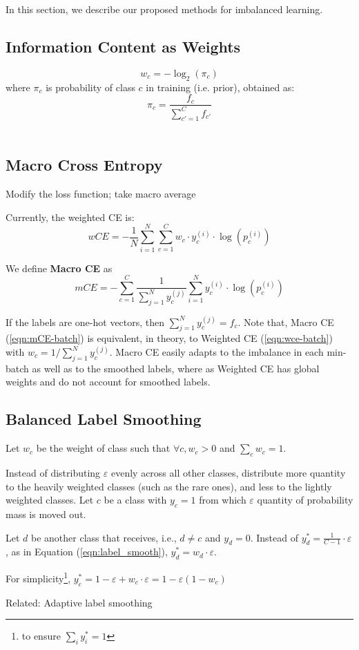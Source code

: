 In this section, we describe our proposed methods for imbalanced learning.
\subsection{Information Content as Weights}

\cite{shannon1948mathematical}
\begin{equation}
   w_c = -\log_2(\pi_c)
\end{equation}
where $\pi_c$ is probability of class $c$ in training (i.e. prior), obtained as: $$\pi_c = \frac{f_c}{\sum^C_{c'=1}f_{c'}}$$\\


\subsection{Macro Cross Entropy}
Modify the loss function; take macro average

Currently, the weighted CE is:
\begin{equation*}
 wCE = -\frac{1}{N} \sum^N_{i=1} \sum^C_{c=1} w_c \cdot y^{(i)}_c \cdot \log(p^{(i)}_c)
\end{equation*}


We define \textbf{Macro CE} as
\begin{equation} \label{eqn:mCE-batch}
  mCE = -\sum^C_{c=1} \frac{1}{\sum^{N}_{j=1} y^{(j)}_c} \sum^N_{i=1} y^{(i)}_c \cdot \log(p^{(i)}_c)
\end{equation}

If the labels are one-hot vectors, then $\sum^{N}_{j=1} y^{(j)}_c = f_c$. 
Note that, Macro CE (\ref{eqn:mCE-batch}) is equivalent, in theory, to Weighted CE (\ref{eqn:wce-batch}) with $w_c = 1/\sum^{N}_{j=1} y^{(j)}_c$.
Macro CE easily adapts to the imbalance in each min-batch as well as to the smoothed labels, where as Weighted CE has global weights and do not account for smoothed labels.

\subsection{Balanced Label Smoothing}
Let $w_c$ be the weight of class such that $\forall c, w_c > 0$ and $\sum_c w_c = 1$.

Instead of distributing $\varepsilon$ evenly across all other classes, distribute more quantity to the heavily weighted classes (such as the rare ones), and less to the lightly weighted classes. 
 Let $c$ be a class with $y_c=1$ from which $\varepsilon$ quantity of probability mass is moved out.
 
 Let $d$ be another class that receives, i.e., $d \ne c$ and $y_d=0$.  
  Instead of $y^*_d = \frac{1}{C-1} \cdot \varepsilon$, as in Equation (\ref{eqn:label_smooth}), $y^*_d = w_d \cdot \varepsilon$. 
  
  For simplicity\footnote{to ensure $\sum_i y^*_i = 1$}, $y^*_c = 1-\varepsilon + w_c \cdot \varepsilon = 1-\varepsilon(1-w_c)$
  

Related: Adaptive label smoothing \cite{wang-2021-adalabel}